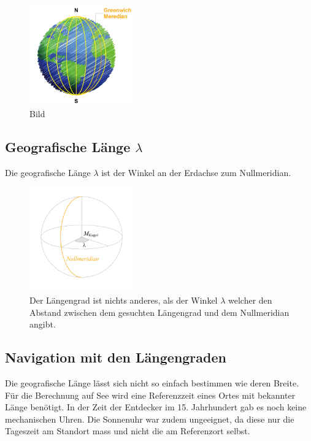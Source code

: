 \begin{refsection}
\begin{figure}[hbtp]
\centering
\includegraphics[width=0.4\textwidth]{kugel/Laengengrad.jpg}
\caption{Bild}
\end{figure}


\subsection{Geografische Länge $\lambda$}
\begin{definition}
Die geografische Länge $\lambda$ ist der Winkel an der Erdachse zum Nullmeridian.
\end{definition}

\begin{figure}[htbp]
\centering
\includegraphics[width=0.4\textwidth]{kugel/GeografischeLaenge.jpg}
\caption{Der Längengrad ist nichts anderes, als der Winkel $\lambda$  welcher den Abstand zwischen dem gesuchten Längengrad und dem Nullmeridian angibt.}
\end{figure}

\subsection{Navigation mit den Längengraden}
Die geografische Länge lässt sich nicht so einfach bestimmen wie deren Breite.
Für die Berechnung auf See wird eine Referenzzeit eines Ortes mit bekannter Länge benötigt.
In der Zeit der Entdecker im 15. Jahrhundert gab es noch keine mechanischen Uhren. Die Sonnenuhr war zudem ungeeignet, da diese nur die Tageszeit am Standort mass und nicht die am Referenzort selbst.


\end{refsection}
